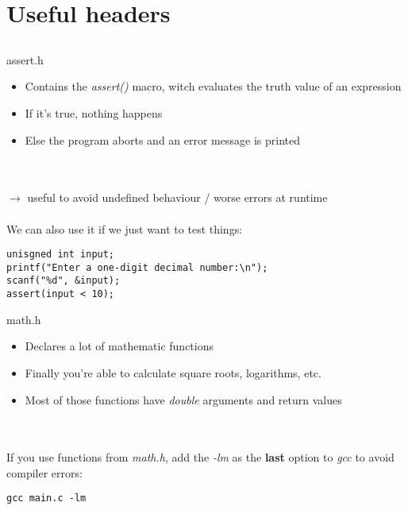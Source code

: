 \section{Useful headers}
\subsection{}
\begin{frame}[fragile]{assert.h}
	 \begin{itemize}
	 	\item Contains the \textit{assert()} macro, witch evaluates the truth value of an expression
	 	\item If it's true, nothing happens
	 	\item Else the program aborts and an error message is printed
	 \end{itemize} \ \\ \ \\
	 $\rightarrow$ useful to avoid undefined behaviour / worse errors at runtime \\ \ \\
	 We can also use it if we just want to test things:
	 \begin{lstlisting}[numbers=none]
unisgned int input;
printf("Enter a one-digit decimal number:\n");
scanf("%d", &input);
assert(input < 10);
\end{lstlisting}
\end{frame}
\begin{frame}[fragile]{math.h}
	\begin{itemize}
		\item Declares a lot of mathematic functions
		\item Finally you're able to calculate square roots, logarithms, etc.
		\item Most of those functions have \textit{double} arguments and return values
	\end{itemize} \ \\ \ \\
	If you use functions from \textit{math.h}, add the \textit{-lm} as the \textbf{last} option to \textit{gcc} to avoid compiler errors:
	\begin{lstlisting}[numbers=none]
gcc main.c -lm
\end{lstlisting}
\end{frame}
